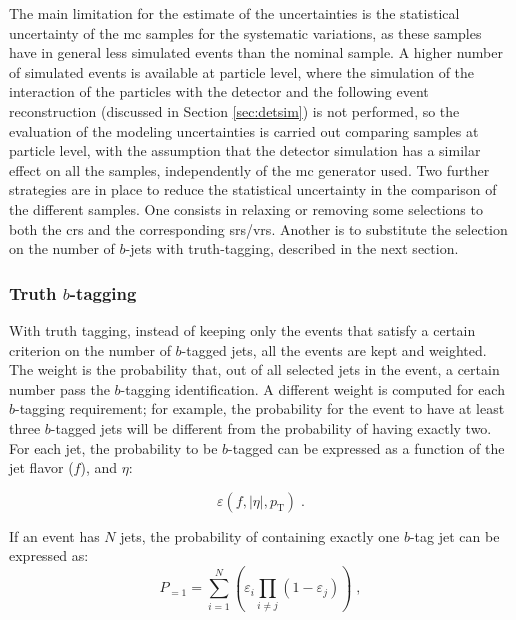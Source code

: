 The main limitation for the estimate of the uncertainties is the statistical uncertainty of the \gls{mc} samples for the systematic variations, as these samples have in general less simulated events than the nominal sample. 
A higher number of simulated events is available at particle level, where the simulation of the interaction of the particles with the detector and the following event reconstruction (discussed in Section \ref{sec:detsim}) is not performed, so the evaluation of the \ttbar modeling uncertainties is carried out 
comparing samples at particle level, with the assumption that the detector simulation has a similar effect on all the samples, 
independently of the \gls{mc} generator used. Two further strategies are in place to reduce the statistical uncertainty in the comparison of the different samples. 
One consists in relaxing or removing some selections to both the \glspl{cr} and the corresponding \glspl{sr}/\glspl{vr}. 
Another is to substitute the selection on the number of $b$-jets with truth-tagging, described in the next section.

\subsubsection*{Truth $b$-tagging}

With truth tagging, instead of keeping only the events that satisfy a certain criterion on the number of $b$-tagged jets, all the events are kept and weighted. The weight is the probability that, out of all selected jets in the event,
a certain number pass the $b$-tagging identification.
A different weight is computed for each $b$-tagging requirement; 
for example, the probability for the event to have at least three $b$-tagged jets will be different from the probability of having exactly two. 
For each jet, the probability to be $b$-tagged can be expressed as a function of the jet flavor ($f$), \pt and $\eta$:

\begin{equation}
\varepsilon \left(f,|\eta|,p_{\mathrm{T}}\right) \; . 
\label{eq:susy_common:btageff}
\end{equation}

\noindent If an event has $N$ jets, the probability of containing exactly one $b$-tag jet can be expressed as:
\begin{equation}
        P_{=1} = \sum\limits_{i=1}^N \left( \varepsilon_{i} \prod\limits_{i \neq j} \left( 1 - \varepsilon_{j} \right) \right) \; , \nonumber
\end{equation}


